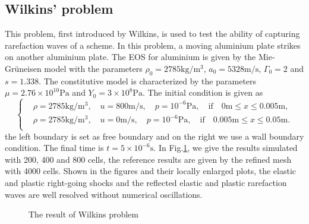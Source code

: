 \documentclass[review]{elsarticle}
\begin{document}
\subsection{Wilkins' problem}
This problem, first introduced by Wilkins\cite{wilkins1963calculation}, is used to test the  ability of capturing rarefaction waves of a scheme. In this problem, a moving aluminium plate strikes on another aluminium plate. The EOS for aluminium is given by the Mie-Gr\"uneisen model with the parameters $\rho_0 = 2785 \text{kg}/\text{m}^3$, $ a_0 = 5328 \text{m} /\text{s}$, $\Gamma_0 =2$ and $s = 1.338$. The constitutive model is characterized by the parameters $\mu = 2.76\times 10^{10} \text{Pa}$ and $Y_0 = 3\times 10^8 \text{Pa}$. The initial condition is given as
\begin{equation}
 \left\{ \begin{aligned}
   &  \rho = 2785 \text{kg}/\text{m}^3, \quad  u = 800\text{m}/\text{s}, \quad  p = 10^{-6}\text{Pa}, \quad  \text{if} \quad  0\text{m} \le x \le 0.005 \text{m},\\
   &  \rho = 2785 \text{kg}/\text{m}^3, \quad  u = 0\text{m}/\text{s}, \quad  p = 10^{-6}\text{Pa}, \quad  \text{if}  \quad  0.005\text{m} \le x \le 0.05 \text{m}.\\
   \end{aligned}
 \right.
\end{equation}
the left boundary is set as free boundary and on  the right we use a wall boundary condition. The final time is $t =5\times 10^{-6} \text{s}$. In Fig.\ref{fig:Wilkins1}, we give the results  simulated with 200, 400 and 800 cells, the reference results are given by the refined mesh with 4000 cells. Shown in the figures and their locally enlarged plots, the elastic and plastic right-going shocks and the reflected elastic and plastic rarefaction waves are well resolved without numerical oscillations.

\begin{figure}
      \caption{ The result of Wilkins problem}
      \label{fig:Wilkins1}
    \end{figure}
\end{document}
